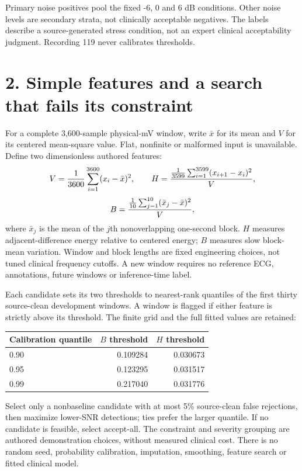 \documentclass[10pt,letterpaper]{article}
\begin{document}
Primary noise positives pool the fixed -6, 0 and 6 dB conditions. Other noise levels are secondary strata, not clinically acceptable negatives. The labels describe a source-generated stress condition, not an expert clinical acceptability judgment. Recording 119 never calibrates thresholds.
\newpage
\section*{2. Simple features and a search that fails its constraint}
For a complete 3,600-sample physical-mV window, write $\bar x$ for its mean and $V$ for its centered mean-square value. Flat, nonfinite or malformed input is unavailable. Define two dimensionless authored features:
\[
 V={1\over3600}\sum_{i=1}^{3600}(x_i-\bar x)^2,\qquad
 H={\frac1{3599}\sum_{i=1}^{3599}(x_{i+1}-x_i)^2\over V},
\]
\[
 B={\frac1{10}\sum_{j=1}^{10}(\bar x_j-\bar x)^2\over V},
\]
where $\bar x_j$ is the mean of the $j$th nonoverlapping one-second block. $H$ measures adjacent-difference energy relative to centered energy; $B$ measures slow block-mean variation. Window and block lengths are fixed engineering choices, not tuned clinical frequency cutoffs. A new window requires no reference ECG, annotations, future windows or inference-time label.

Each candidate sets its two thresholds to nearest-rank quantiles of the first thirty source-clean development windows. A window is flagged if either feature is strictly above its threshold. The finite grid and the full fitted values are retained:
\begin{center}\begin{tabular}{@{}lrr@{}}\toprule
Calibration quantile & $B$ threshold & $H$ threshold\\\midrule
0.90 & 0.109284 & 0.030673 \\
0.95 & 0.123295 & 0.031517 \\
0.99 & 0.217040 & 0.031776 \\
\bottomrule\end{tabular}\end{center}

Select only a nonbaseline candidate with at most 5\% source-clean false rejections, then maximize lower-SNR detections; ties prefer the larger quantile. If no candidate is feasible, select accept-all. The constraint and severity grouping are authored demonstration choices, without measured clinical cost. There is no random seed, probability calibration, imputation, smoothing, feature search or fitted clinical model.
\end{document}
